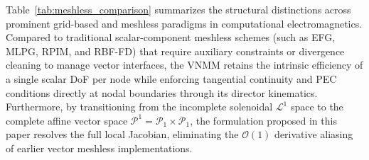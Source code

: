 \documentclass[preprint,12pt]{elsarticle}
\begin{document}
Table~\ref{tab:meshless_comparison} summarizes the structural distinctions across prominent grid-based and meshless paradigms in computational electromagnetics. Compared to traditional scalar-component meshless schemes (such as EFG, MLPG, RPIM, and RBF-FD) that require auxiliary constraints or divergence cleaning to manage vector interfaces, the VNMM retains the intrinsic efficiency of a single scalar DoF per node while enforcing tangential continuity and PEC conditions directly at nodal boundaries through its director kinematics. Furthermore, by transitioning from the incomplete solenoidal $\mathcal{L}^1$ space to the complete affine vector space $\mathcal{P}^1 = \mathcal{P}_1 \times \mathcal{P}_1$, the  formulation proposed in this paper resolves the full local Jacobian, eliminating the $\mathcal{O}(1)$ derivative aliasing of earlier vector meshless implementations. 
\end{document}
